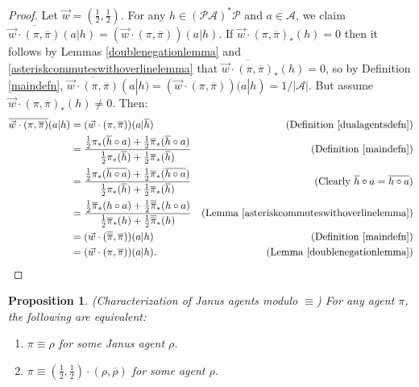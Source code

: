 \documentclass{article}
\newtheorem{proposition}[theorem]{Proposition}
\begin{document}
\begin{proof}
    Let $\vec w=(\frac12,\frac12)$.
    For any $h\in(\mathcal P\mathcal A)^*\mathcal P$ and $a\in\mathcal A$,
    we claim
    $\overline{\vec w\cdot(\pi,\overline{\pi})}(a|h)
    =(\vec w\cdot(\pi,\overline{\pi}))(a|h)$.
    If $\vec w\cdot(\pi,\overline\pi)_*(h)=0$
    then it follows by Lemmas \ref{doublenegationlemma} and
    \ref{asteriskcommuteswithoverlinelemma} that
    $\overline{\vec w\cdot(\pi,\overline\pi)}_*(h)=0$,
    so by Definition \ref{maindefn},
    $\overline{\vec w\cdot(\pi,\overline{\pi})}(a|h)
    =(\vec w\cdot(\pi,\overline{\pi}))(a|h)=1/|\mathcal A|$.
    But assume $\vec w\cdot(\pi,\overline\pi)_*(h)\not=0$.
    Then:
    \begin{align*}
        \overline{\vec w\cdot(\pi,\overline{\pi})}(a|h)
        &= (\vec w\cdot(\pi,\overline{\pi}))(a|\overline h)
            &\mbox{(Definition \ref{dualagentsdefn})}\\
        &= \frac
            {\frac12\pi_*(\overline h\circ a)+\frac12\overline\pi_*(\overline h\circ a)}
            {\frac12\pi_*(\overline h)+\frac12\overline\pi_*(\overline h)}
            &\mbox{(Definition \ref{maindefn})}\\
        &= \frac
            {\frac12\pi_*(\overline{h\circ a})+\frac12\overline\pi_*(\overline{h\circ a})}
            {\frac12\pi_*(\overline h)+\frac12\overline\pi_*(\overline h)}
            &\mbox{(Clearly $\overline h\circ a=\overline{h\circ a}$)}\\
        &= \frac
            {\frac12\overline\pi_*(h\circ a)+\frac12\overline{\overline\pi}_*(h\circ a)}
            {\frac12\overline\pi_*(h)+\frac12\overline{\overline\pi}_*(h)}
            &\mbox{(Lemma \ref{asteriskcommuteswithoverlinelemma})}\\
        &= (\vec w\cdot(\overline{\overline\pi},\overline\pi))(a|h)
            &\mbox{(Definition \ref{maindefn})}\\
        &= (\vec w\cdot(\pi,\overline\pi))(a|h).
            &\mbox{(Lemma \ref{doublenegationlemma})}
    \end{align*}
\end{proof}

\begin{proposition}
    (Characterization of Janus agents modulo $\equiv$)
    For any agent $\pi$, the following are equivalent:
    \begin{enumerate}
        \item $\pi\equiv\rho$ for some Janus agent $\rho$.
        \item $\pi\equiv(\frac12,\frac12)\cdot(\rho,\overline{\rho})$
            for some agent $\rho$.
    \end{enumerate}
\end{proposition}
\end{document}
